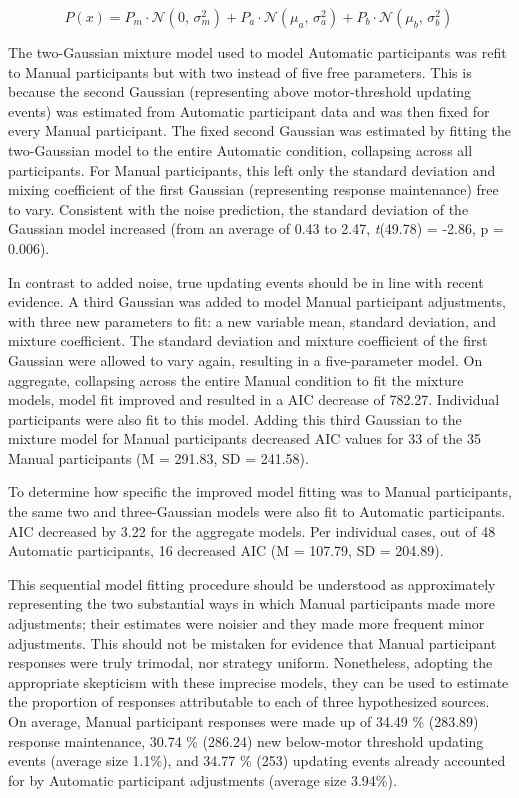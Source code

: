 \documentclass[sn-apa]{sn-jnl}\usepackage[]{graphicx}\usepackage[]{xcolor}
\begin{document}
\begin{equation}
  P(x) = P_m \cdot \mathcal{N}(0,\,\sigma_{m}^{2}) + P_a \cdot \mathcal{N}(\mu_{a},\,\sigma_{a}^{2}) + P_b \cdot \mathcal{N}(\mu_{b},\,\sigma_{b}^{2})\,
\end{equation}

The two-Gaussian mixture model used to model Automatic participants was refit to Manual participants but with two instead of five free parameters. This is because the second Gaussian (representing above motor-threshold updating events) was estimated from Automatic participant data and was then fixed for every Manual participant. The fixed second Gaussian was estimated by fitting the two-Gaussian model to the entire Automatic condition, collapsing across all participants. For Manual participants, this left only the standard deviation and mixing coefficient of the first Gaussian (representing response maintenance) free to vary.  Consistent with the noise prediction, the standard deviation of the Gaussian model increased (from an average of 0.43 to 2.47, \textit{t}(49.78) = -2.86, p = 0.006).

In contrast to added noise, true updating events should be in line with recent evidence. A third Gaussian was added to model Manual participant adjustments, with three new parameters to fit: a new variable mean, standard deviation, and mixture coefficient. The standard deviation and mixture coefficient of the first Gaussian were allowed to vary again, resulting in a five-parameter model. On aggregate, collapsing across the entire Manual condition to fit the mixture models, model fit improved and resulted in a AIC decrease of 782.27. Individual participants were also fit to this model. Adding this third Gaussian to the mixture model for Manual participants decreased AIC values for 33 of the 35 Manual participants (M = 291.83, SD = 241.58). 

To determine how specific the improved model fitting was to Manual participants, the same two and three-Gaussian models were also fit to Automatic participants. AIC decreased by 3.22 for the aggregate models. Per individual cases, out of 48 Automatic participants, 16 decreased AIC (M = 107.79, SD = 204.89).





This sequential model fitting procedure should be understood as approximately representing the two substantial ways in which Manual participants made more adjustments; their estimates were noisier and they made more frequent minor adjustments. This should not be mistaken for evidence that Manual participant responses were truly trimodal, nor strategy uniform. Nonetheless, adopting the appropriate skepticism with these imprecise models, they can be used to estimate the proportion of responses attributable to each of three hypothesized sources. On average, Manual participant responses were made up of 34.49 \% (283.89) response maintenance, 30.74 \% (286.24) new below-motor threshold updating events (average size 1.1\%), and 34.77 \% (253) updating events already accounted for by Automatic participant adjustments (average size 3.94\%). 
\end{document}
